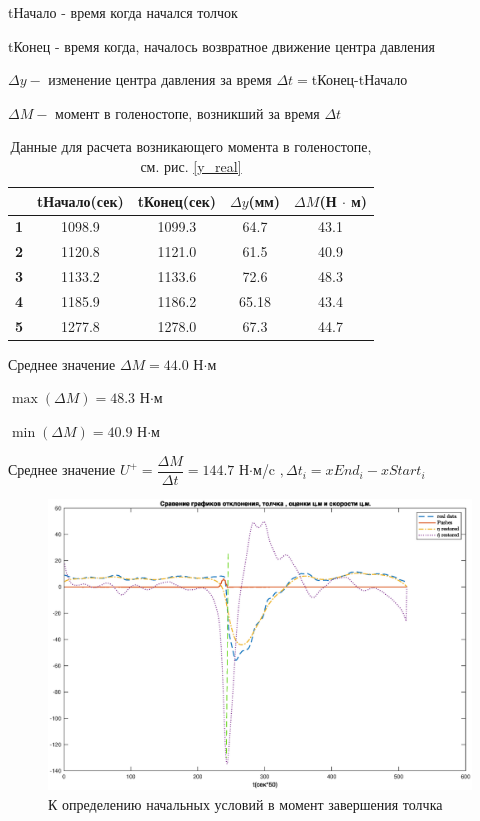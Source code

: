 \documentclass[a4paper,12pt, openany]{book}
\theoremstyle{plain} %
\theoremstyle{definition} %
\theoremstyle{remark} %
\numberwithin{equation}{chapter}
\begin{document}
{tНачало - время когда начался толчок

tКонец - время когда, началось возвратное движение центра давления

$\Delta y - $ изменение центра давления за время $\Delta t = $tКонец-tНачало

$\Delta M - $ момент в голеностопе, возникший за время $\Delta t$
\begin{table}[h!]
    \centering
    \begin{tabular}{|l|c|c|c|c|}
        \hline
        \textbf{}                                    &
        \multicolumn{1}{l|}{\textbf{tНачало(сек)}}    &
        \multicolumn{1}{l|}{\textbf{tКонец(сек)}}      &
        \multicolumn{1}{l|}{\textbf{$\Delta y$(мм)}} &
        \multicolumn{1}{l|}{\textbf{$\Delta M $(Н $\cdot$ м)}}                        \\ \hline
        \textbf{1}                                   & 1098.9 & 1099.3 & 64.7  & 43.1 \\ \hline
        \textbf{2}                                   & 1120.8 & 1121.0 & 61.5  & 40.9 \\ \hline
        \textbf{3}                                   & 1133.2 & 1133.6 & 72.6  & 48.3 \\ \hline
        \textbf{4}                                   & 1185.9 & 1186.2 & 65.18 & 43.4 \\ \hline
        \textbf{5}                                   & 1277.8 & 1278.0 & 67.3  & 44.7 \\ \hline
    \end{tabular}
    \caption{Данные для расчета возникающего момента в голеностопе, см. рис. \ref{y_real} }
    \label{moments_calculating}
\end{table}

Среднее значение $\Delta M=44.0$ Н$\cdot$м

$\max(\Delta M)=48.3$ Н$\cdot$м

$\min(\Delta M)=40.9$ Н$\cdot$м

Среднее значение $U^+=\dfrac{\Delta M}{\Delta t}=144.7$ Н$\cdot$м/c $,\Delta t_i=xEnd_i-xStart_i$
\begin{figure}[h!]
    \centering
    \includegraphics[width=0.95\linewidth]{all_real.eps}
    \caption{К определению начальных условий в момент завершения толчка}
    \label{all_real}
\end{figure}

}
\end{document}
